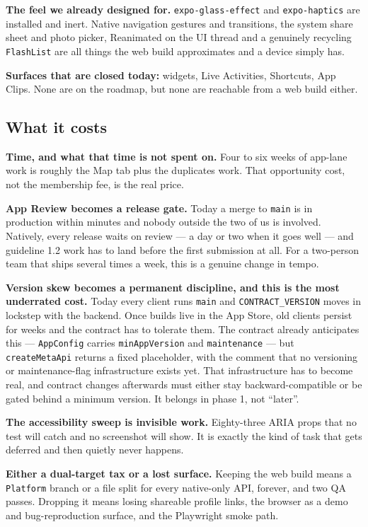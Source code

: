 \documentclass[11pt]{article}
\newcommand{\code}[1]{\texttt{\small #1}}
\begin{document}
\textbf{The feel we already designed for.} \code{expo-glass-effect} and \code{expo-haptics} are
installed and inert. Native navigation gestures and transitions, the system share sheet and photo
picker, Reanimated on the UI thread and a genuinely recycling \code{FlashList} are all things the web
build approximates and a device simply has.

\textbf{Surfaces that are closed today:} widgets, Live Activities, Shortcuts, App Clips. None are on
the roadmap, but none are reachable from a web build either.

\subsection{What it costs}

\textbf{Time, and what that time is not spent on.} Four to six weeks of app-lane work is roughly the
Map tab plus the duplicates work. That opportunity cost, not the membership fee, is the real price.

\textbf{App Review becomes a release gate.} Today a merge to \code{main} is in production within
minutes and nobody outside the two of us is involved. Natively, every release waits on review --- a
day or two when it goes well --- and guideline 1.2 work has to land before the first submission at
all. For a two-person team that ships several times a week, this is a genuine change in tempo.

\textbf{Version skew becomes a permanent discipline, and this is the most underrated cost.} Today
every client runs \code{main} and \code{CONTRACT\_VERSION} moves in lockstep with the backend. Once
builds live in the App Store, old clients persist for weeks and the contract has to tolerate them.
The contract already anticipates this --- \code{AppConfig} carries \code{minAppVersion} and
\code{maintenance} --- but \code{createMetaApi} returns a fixed placeholder, with the comment that no
versioning or maintenance-flag infrastructure exists yet. That infrastructure has to become real, and
contract changes afterwards must either stay backward-compatible or be gated behind a minimum
version. It belongs in phase 1, not ``later''.

\textbf{The accessibility sweep is invisible work.} Eighty-three ARIA props that no test will catch
and no screenshot will show. It is exactly the kind of task that gets deferred and then quietly never
happens.

\textbf{Either a dual-target tax or a lost surface.} Keeping the web build means a
\code{Platform} branch or a file split for every native-only API, forever, and two QA passes.
Dropping it means losing shareable profile links, the browser as a demo and bug-reproduction surface,
and the Playwright smoke path.
\end{document}
